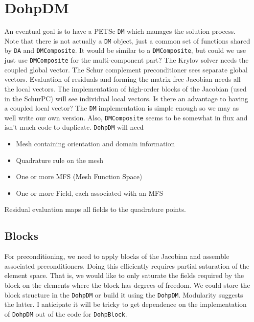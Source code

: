 \documentclass[a4paper]{article}
\newcommand{\trl}[1]{\texttt{#1}}
\begin{document}
\section{DohpDM}
An eventual goal is to have a PETSc \trl{DM} which manages the solution process.  Note that there is not actually a
\trl{DM} object, just a common set of functions shared by \trl{DA} and \trl{DMComposite}.  It would be similar to a
\trl{DMComposite}, but could we use just use \trl{DMComposite} for the multi-component part?  The Krylov solver needs
the coupled global vector.  The Schur complement preconditioner sees separate global vectors.  Evaluation of residuals
and forming the matrix-free Jacobian needs all the local vectors.  The implementation of high-order blocks of the
Jacobian (used in the SchurPC) will see individual local vectors.  Is there an advantage to having a coupled local
vector?  The \trl{DM} implementation is simple enough so we may as well write our own version.  Also, \trl{DMComposite}
seems to be somewhat in flux and isn't much code to duplicate.  \trl{DohpDM} will need
\begin{itemize}
\item Mesh containing orientation and domain information
\item Quadrature rule on the mesh
\item One or more MFS (Mesh Function Space)
\item One or more Field, each associated with an MFS
\end{itemize}
Residual evaluation maps all fields to the quadrature points.

\subsection{Blocks}
For preconditioning, we need to apply blocks of the Jacobian and assemble associated preconditioners.  Doing this
efficiently requires partial saturation of the element space.  That is, we would like to only saturate the fields
required by the block on the elements where the block has degrees of freedom.  We could store the block structure in the
\trl{DohpDM} or build it using the \trl{DohpDM}.  Modularity suggests the latter.  I anticipate it will be tricky to get
dependence on the implementation of \trl{DohpDM} out of the code for \trl{DohpBlock}.
\end{document}
